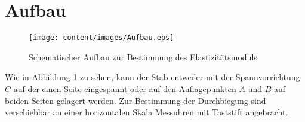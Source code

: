 \section{Aufbau}
\label{sec:Aufbau}
\begin{figure}
	\centering
	\texttt{[image: content/images/Aufbau.eps]}
	\caption{Schematischer Aufbau zur Bestimmung des Elastizitätsmoduls\cite{V103}}
	\label{fig:Aufbau}
\end{figure}
Wie in Abbildung \ref{fig:Aufbau} zu sehen, kann der Stab entweder mit der Spannvorrichtung $C$ auf der einen Seite eingespannt oder auf den Auflagepunkten $A$ und $B$ auf beiden Seiten gelagert werden.
Zur Bestimmung der Durchbiegung sind verschiebbar an einer horizontalen Skala Messuhren mit Taststift angebracht.
